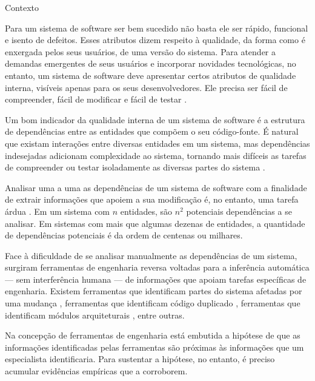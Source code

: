 \begin{section}{Contexto}

		Para um sistema de software ser bem sucedido não basta ele ser rápido, funcional e isento de defeitos. Esses atributos dizem respeito à qualidade, da forma como é enxergada pelos seus usuários, de uma versão do sistema. Para atender a demandas emergentes de seus usuários e incorporar novidades tecnológicas, no entanto, um sistema de software deve apresentar certos atributos de qualidade interna, visíveis apenas para os seus desenvolvedores. Ele precisa ser fácil de compreender, fácil de modificar e fácil de testar \cite{Parnas1994}.

		Um bom indicador da qualidade interna de um sistema de software é a estrutura de dependências entre as entidades que compõem o seu código-fonte. É natural que existam interações entre diversas entidades em um sistema, mas dependências indesejadas adicionam complexidade ao sistema, tornando mais difíceis as tarefas de compreender ou testar isoladamente as diversas partes do sistema \cite{Chidamber1994}. %

		Analisar uma a uma as dependências de um sistema de software com a finalidade de extrair informações que apoiem a sua modificação é, no entanto, uma tarefa árdua \cite{Tonella2007}. Em um sistema com $n$ entidades, são $n^2$ potenciais dependências a se analisar. Em sistemas com mais que algumas dezenas de entidades, a quantidade de dependências potenciais é da ordem de centenas ou milhares. %
		
		Face à dificuldade de se analisar manualmente as dependências de um sistema, surgiram ferramentas de engenharia reversa voltadas para a inferência automática --- sem interferência humana --- de informações que apoiam tarefas específicas de engenharia. Existem ferramentas que identificam partes do sistema afetadas por uma mudança \cite{Arnold1993}, ferramentas que identificam código duplicado \cite{Roy2007}, ferramentas que identificam módulos arquiteturais \cite{Maqbool2007}, entre outras. 

		Na concepção de ferramentas de engenharia está embutida a hipótese de que as informações identificadas pelas ferramentas são próximas às informações que um especialista identificaria. Para sustentar a hipótese, no entanto, é preciso acumular evidências empíricas que a corroborem.


\end{section}

